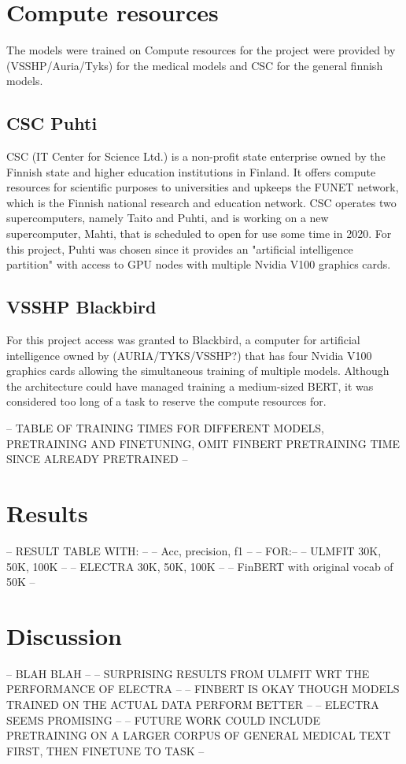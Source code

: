 \section{Compute resources} \label{Compute resources}
The models were trained on
Compute resources for the project were provided by (VSSHP/Auria/Tyks) for the medical models and CSC for the general finnish models.

\subsection{CSC Puhti} \label{CSC Puhti}
CSC (IT Center for Science Ltd.) is a non-profit state enterprise owned by the Finnish state and higher education institutions in Finland.
It offers compute resources for scientific purposes to universities and upkeeps the FUNET network, which is the Finnish national research and education network.
CSC operates two supercomputers, namely Taito and Puhti, and is working on a new supercomputer, Mahti, that is scheduled to open for use some time in 2020.
For this project, Puhti was chosen since it provides an "artificial intelligence partition" with access to GPU nodes with multiple Nvidia V100 graphics cards.

\subsection{VSSHP Blackbird} \label{VSSHP Blackbird}
For this project access was granted to Blackbird, a computer for artificial intelligence owned by (AURIA/TYKS/VSSHP?) that has four Nvidia V100 graphics cards allowing the simultaneous training of multiple models.
Although the architecture could have managed training a medium-sized BERT, it was considered too long of a task to reserve the compute resources for.

-- TABLE OF TRAINING TIMES FOR DIFFERENT MODELS, PRETRAINING AND FINETUNING, OMIT FINBERT PRETRAINING TIME SINCE ALREADY PRETRAINED --

\section{Results} \label{Results}

-- RESULT TABLE WITH: --
-- Acc, precision, f1 --
-- FOR:--
-- ULMFIT 30K, 50K, 100K --
-- ELECTRA 30K, 50K, 100K --
-- FinBERT with original vocab of 50K --

\section{Discussion}\label{Discussion}
-- BLAH BLAH --
-- SURPRISING RESULTS FROM ULMFIT WRT THE PERFORMANCE OF ELECTRA --
-- FINBERT IS OKAY THOUGH MODELS TRAINED ON THE ACTUAL DATA PERFORM BETTER --
-- ELECTRA SEEMS PROMISING --
-- FUTURE WORK COULD INCLUDE PRETRAINING ON A LARGER CORPUS OF GENERAL MEDICAL TEXT FIRST, THEN FINETUNE TO TASK --

